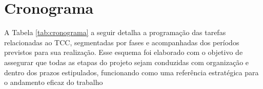 \chapter{Cronograma}

A Tabela \ref{tab:cronograma} a seguir detalha a programação das tarefas relacionadas ao TCC, segmentadas por fases e acompanhadas dos períodos previstos para sua realização. Esse esquema foi elaborado com o objetivo de assegurar que todas as etapas do projeto sejam conduzidas com organização e dentro dos prazos estipulados, funcionando como uma referência estratégica para o andamento eficaz do trabalho

\begin{table}[htb]
\end{table}